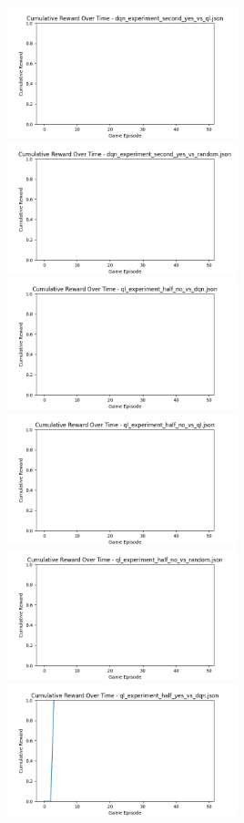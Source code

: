 \includegraphics[width=0.5\textwidth]{images/cumulative_reward_dqn_experiment_second_yes_vs_ql.png} 
\includegraphics[width=0.5\textwidth]{images/cumulative_reward_dqn_experiment_second_yes_vs_random.png} 
\includegraphics[width=0.5\textwidth]{images/cumulative_reward_ql_experiment_half_no_vs_dqn.png} 
\includegraphics[width=0.5\textwidth]{images/cumulative_reward_ql_experiment_half_no_vs_ql.png} 
\includegraphics[width=0.5\textwidth]{images/cumulative_reward_ql_experiment_half_no_vs_random.png} 
\includegraphics[width=0.5\textwidth]{images/cumulative_reward_ql_experiment_half_yes_vs_dqn.png} 

